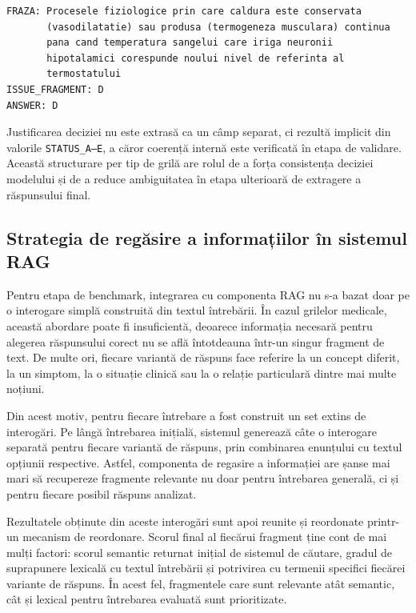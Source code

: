 \documentclass[12pt, a4paper, oneside, romanian]{teza-upb}
\begin{document}
\begin{center}
\begin{minipage}{0.78\textwidth}
\begin{lstlisting}[numbers=none]
FRAZA: Procesele fiziologice prin care caldura este conservata
       (vasodilatatie) sau produsa (termogeneza musculara) continua
       pana cand temperatura sangelui care iriga neuronii
       hipotalamici corespunde noului nivel de referinta al
       termostatului
ISSUE_FRAGMENT: D
ANSWER: D
\end{lstlisting}
\end{minipage}
\end{center}

Justificarea deciziei nu este extrasă ca un câmp separat, ci rezultă implicit din valorile \texttt{STATUS\_A--E}, a căror coerență internă este verificată în etapa de validare. Această structurare per tip de grilă are rolul de a forța consistența deciziei modelului și de a reduce ambiguitatea în etapa ulterioară de extragere a răspunsului final.

\subsection{Strategia de regăsire a informațiilor în sistemul RAG}

Pentru etapa de benchmark, integrarea cu componenta RAG nu s-a bazat doar pe o interogare simplă construită din textul întrebării. În cazul grilelor medicale, această abordare poate fi insuficientă, deoarece informația necesară pentru alegerea răspunsului corect nu se află întotdeauna într-un singur fragment de text. De multe ori, fiecare variantă de răspuns face referire la un concept diferit, la un simptom, la o situație clinică sau la o relație particulară dintre mai multe noțiuni.

Din acest motiv, pentru fiecare întrebare a fost construit un set extins de interogări. Pe lângă întrebarea inițială, sistemul generează câte o interogare separată pentru fiecare variantă de răspuns, prin combinarea enunțului cu textul opțiunii respective. Astfel, componenta de regasire a informației are șanse mai mari să recupereze fragmente relevante nu doar pentru întrebarea generală, ci și pentru fiecare posibil răspuns analizat.

Rezultatele obținute din aceste interogări sunt apoi reunite și reordonate printr-un mecanism de reordonare. Scorul final al fiecărui fragment ține cont de mai mulți factori: scorul semantic returnat inițial de sistemul de căutare, gradul de suprapunere lexicală cu textul întrebării și potrivirea cu termenii specifici fiecărei variante de răspuns. În acest fel, fragmentele care sunt relevante atât semantic, cât și lexical pentru întrebarea evaluată sunt prioritizate.
\end{document}
